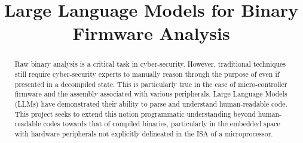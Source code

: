 \documentclass[conference,compsoc]{IEEEtran}
\begin{document}
\title{Large Language Models for Binary Firmware Analysis}


\author{
\and
{}
}

\maketitle

\begin{abstract}
Raw binary analysis is a critical task in cyber-security. However, traditional
  techniques still require cyber-security experts to manually reason through the
  purpose of even if presented in a decompiled state. This is particularly true
  in the case of micro-controller firmware and the assembly associated with
  various peripherals. Large Language Models (LLMs) have demonstrated their
  ability to parse and understand human-readable code. This project seeks to
  extend this notion programmatic understanding beyond human-readable codes
  towards that of compiled binaries, particularly in the embedded space with
  hardware peripherals not explicitly delineated in the ISA of a microprocessor.

\end{abstract}
\end{document}

